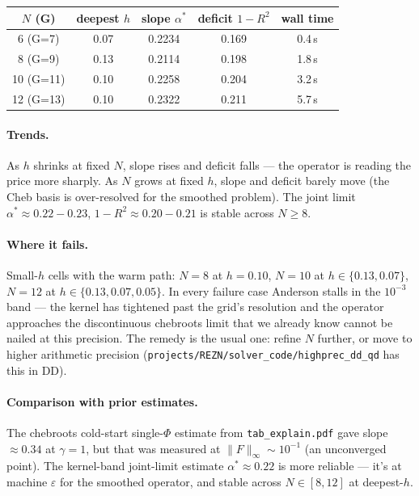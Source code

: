 \documentclass[11pt]{article}
\begin{document}
\begin{center}
\begin{tabular}{ccccc}
\toprule
$N$ (G)    & deepest $h$ & slope $\alpha^*$ & deficit $1-R^2$ & wall time \\
\midrule
6  (G=7)   & 0.07 & 0.2234 & 0.169 & 0.4\,s \\
8  (G=9)   & 0.13 & 0.2114 & 0.198 & 1.8\,s \\
10 (G=11)  & 0.10 & 0.2258 & 0.204 & 3.2\,s \\
12 (G=13)  & 0.10 & 0.2322 & 0.211 & 5.7\,s \\
\bottomrule
\end{tabular}
\end{center}

\paragraph{Trends.} As $h$ shrinks at fixed $N$, slope rises and
deficit falls --- the operator is reading the price more sharply. As
$N$ grows at fixed $h$, slope and deficit barely move (the Cheb basis
is over-resolved for the smoothed problem). The joint limit
$\alpha^* \approx 0.22\!-\!0.23$, $1{-}R^2 \approx 0.20\!-\!0.21$ is
stable across $N \ge 8$.

\paragraph{Where it fails.} Small-$h$ cells with the warm path:
$N{=}8$ at $h{=}0.10$, $N{=}10$ at $h\in\{0.13, 0.07\}$, $N{=}12$ at
$h\in\{0.13, 0.07, 0.05\}$. In every failure case Anderson stalls in
the $10^{-3}$ band --- the kernel has tightened past the grid's
resolution and the operator approaches the discontinuous chebroots
limit that we already know cannot be nailed at this precision. The
remedy is the usual one: refine $N$ further, or move to higher
arithmetic precision (\texttt{projects/REZN/solver\_code/highprec\_dd\_qd}
has this in DD).

\paragraph{Comparison with prior estimates.}
The chebroots cold-start single-$\Phi$ estimate from
\texttt{tab\_explain.pdf} gave slope $\approx 0.34$ at $\gamma{=}1$,
but that was measured at $\|F\|_\infty \sim 10^{-1}$ (an unconverged
point). The kernel-band joint-limit estimate $\alpha^* \approx 0.22$
is more reliable --- it's at machine $\varepsilon$ for the smoothed
operator, and stable across $N \in [8, 12]$ at deepest-$h$.
\end{document}
